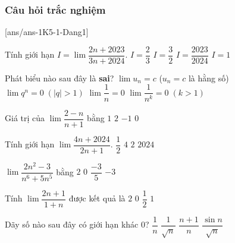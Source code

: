 \subsubsection{Câu hỏi trắc nghiệm}
[ans/ans-1K5-1-Dang1]
\begin{ex}%
	Tính giới hạn $I=\lim\dfrac{2n+2023}{3n+2024}$. 
	\choice
	{\True $I=\dfrac{2}{3}$}
	{$I=\dfrac{3}{2}$}
	{$I=\dfrac{2023}{2024}$}
	{$I=1$}
\end{ex}
\begin{ex}%
	Phát biểu nào sau đây là \textbf{sai}?
	\choice
	{$\lim u_n=c$ ($u_n=c$ là hằng số)}
	{\True $\lim q^n=0 \;(|q|>1)$}
	{$\lim\dfrac{1}{n}=0$}
	{$\lim\dfrac{1}{n^k}=0 \; (k>1)$}
\end{ex}
\begin{ex}%
	Giá trị của $\lim\dfrac{2-n}{n+1}$ bằng
	\choice
	{$1$}
	{$2$}
	{\True $-1$}
	{$0$}
\end{ex}
\begin{ex}%
	Tính giới hạn $\lim\dfrac{4n+2024}{2n+1}$. 
	\choice
	{$\dfrac{1}{2}$}
	{$4$}
	{\True $2$}
	{$2024$}
\end{ex}
\begin{ex}%
	$\lim\dfrac{2n^2-3}{n^6+5n^5}$ bằng 
	\choice
	{$2$}
	{\True $0$}
	{$\dfrac{-3}{5}$}
	{$-3$}
\end{ex}
\begin{ex}%
	Tính $\lim\dfrac{2n+1}{1+n}$ được kết quả là
	\choice
	{\True $2$}
	{$0$}
	{$\dfrac{1}{2}$}
	{$1$}
\end{ex}

\begin{ex}%
	Dãy số nào sau đây có giới hạn khác $0$?
	\choice
	{$\dfrac{1}{n}$}
	{$\dfrac{1}{\sqrt{n}}$}
	{\True $\dfrac{n+1}{n}$}
	{$\dfrac{\sin n}{\sqrt{n}}$}
\end{ex}

